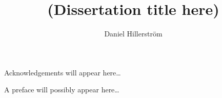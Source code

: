 \documentclass[mscres,icsa,lfcs,twoside,openright,logo,rightchapter,normalheadings]{infthesis}
\title{(Dissertation title here)}
\author{Daniel Hillerström}
\theoremstyle{definition}
\begin{document}
\raggedbottom
\begin{preliminary}

\maketitle

\begin{acknowledgements}
Acknowledgements will appear here\dots
\end{acknowledgements}

\standarddeclaration


\begin{preface}
A preface will possibly appear here\dots
\end{preface}

\setcounter{secnumdepth}{2} %
\setcounter{tocdepth}{2} %
\tableofcontents

\end{preliminary}


%

\singlespace
\printbibliography[heading=bibintoc]

\end{document}
